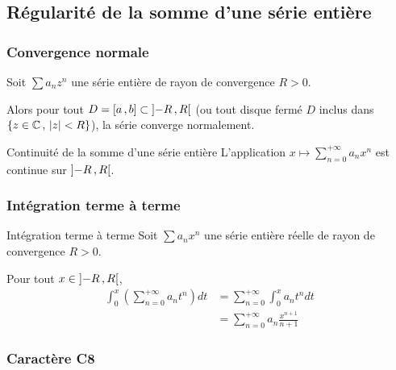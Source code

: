 \subsection{Régularité de la somme d’une série entière}

    \subsubsection{Convergence normale}

    \begin{prop}{}{}
        Soit $\sum a_n z^n$ une série entière de rayon de convergence $R > 0$.

        Alors pour tout $D = \left[ a \, , b \right] \subset \left] -R \, , R \right[$ (ou tout disque fermé $D$ inclus dans $\left\{ z \in \mathbb{C} \, , \, \left\lvert z\right\rvert < R \right\}$), la série converge normalement.
    \end{prop}

    \begin{coro}{Continuité de la somme d’une série entière}{}
        L’application $x \longmapsto \sum_{n=0}^{+\infty} a_n x^n$ est continue sur $\left] -R \, , R \right[$.
    \end{coro}

    \subsubsection{Intégration terme à terme}

    \begin{theo}{Intégration terme à terme}{}
        Soit $\sum a_n x^n$ une série entière \textcolor{myred}{réelle} de rayon de convergence $R > 0$. 

        Pour tout $x \in \left] -R \, , R \right[$,
        \begin{align*}
            \int_{0}^{x} \left(\sum_{n=0}^{+\infty} a_n t^n \right) dt 
            &= \sum_{n=0}^{+\infty} \int_{0}^{x} a_n t^n dt \\
            &= \sum_{n=0}^{+\infty} a_n \frac{x^{n+1}}{n+1}
        \end{align*}
    \end{theo}

    \subsubsection{Caractère C8}

